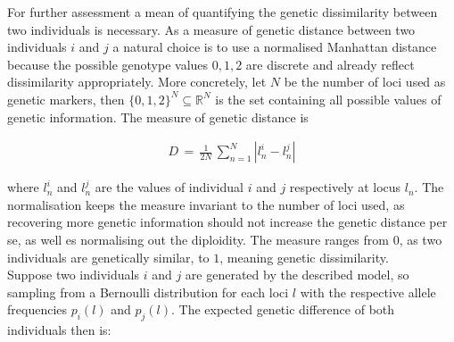 \documentclass[a4paper, 11pt]{article}
\begin{document}
For further assessment a mean of quantifying the genetic dissimilarity between two individuals is necessary. As a measure of genetic distance between two individuals $i$ and $j$ a natural choice is to use a normalised Manhattan distance because the possible genotype values ${0, 1, 2}$ are discrete and already reflect dissimilarity appropriately. More concretely, let $N$ be the number of loci used as genetic markers, then $\{0,1,2\}^N \subseteq \mathbb{R}^N$  is the set containing all possible values of genetic information. The measure of genetic distance is 

\begin{align*}
D\, =\, \frac{1}{2N}\,\sum^{N}_{n = 1} |l^i_n - l^j_n|
\end{align*}

where $l^i_n$ and $l^j_n$ are the values of individual $i$ and $j$ respectively at locus $l_n$. The normalisation keeps the measure invariant to the number of loci used, as recovering more genetic information should not increase the genetic distance per se, as well es normalising out the diploidity. The measure ranges from $0$, as two individuals are genetically similar, to $1$, meaning genetic dissimilarity.
\\
Suppose two individuals $i$ and $j$ are generated by the described model, so sampling from a Bernoulli distribution for each loci $l$ with the respective allele frequencies $p_i(l)$ and $p_j(l)$. The expected genetic difference of both individuals then is:
 
\end{document}
